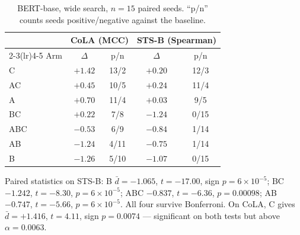 \documentclass{article}
\begin{document}
\begin{table}[h]
\caption{BERT-base, wide search, $n=15$ paired seeds. ``p/n'' counts seeds
positive/negative against the baseline.}
\label{tab:arms}
\begin{center}
\small
\begin{tabular}{lcccc}
\toprule
 & \multicolumn{2}{c}{CoLA (MCC)} & \multicolumn{2}{c}{STS-B (Spearman)} \\
\cmidrule(lr){2-3}\cmidrule(lr){4-5}
Arm & $\Delta$ & p/n & $\Delta$ & p/n \\
\midrule
C   & $\mathbf{+1.42}$ & 13/2 & $+0.20$ & 12/3 \\
AC  & $+0.45$ & 10/5 & $\mathbf{+0.24}$ & 11/4 \\
A   & $+0.70$ & 11/4 & $+0.03$ & \phantom{0}9/5 \\
\midrule
BC  & $+0.22$ & \phantom{0}7/8 & $-1.24$ & \phantom{0}0/15 \\
ABC & $-0.53$ & \phantom{0}6/9 & $-0.84$ & \phantom{0}1/14 \\
AB  & $-1.24$ & \phantom{0}4/11 & $-0.75$ & \phantom{0}1/14 \\
B   & $-1.26$ & \phantom{0}5/10 & $-1.07$ & \phantom{0}0/15 \\
\bottomrule
\end{tabular}
\end{center}
\end{table}

Paired statistics on STS-B: B $\bar{d}=-1.065$, $t=-17.00$, sign
$p=6\times10^{-5}$; BC $-1.242$, $t=-8.30$, $p=6\times10^{-5}$; ABC $-0.837$,
$t=-6.36$, $p=0.00098$; AB $-0.747$, $t=-5.66$, $p=6\times10^{-5}$. All four
survive Bonferroni. On CoLA, C gives $\bar{d}=+1.416$, $t=4.11$, sign
$p=0.0074$ --- significant on both tests but above $\alpha=0.0063$.
\end{document}
